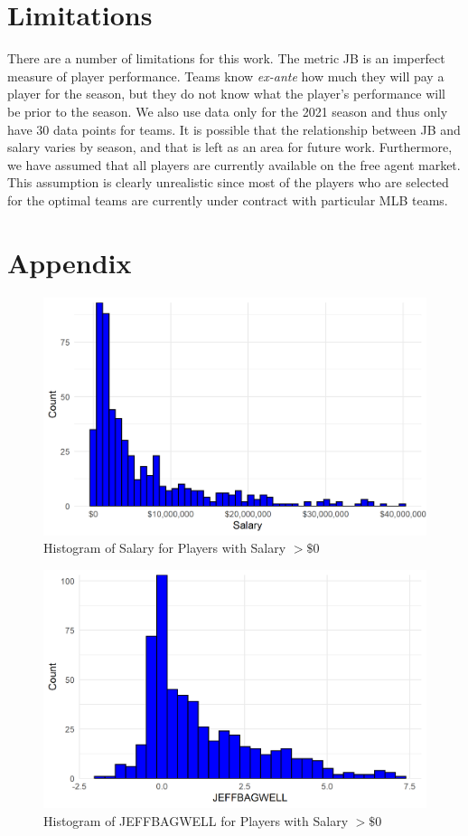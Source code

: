 \documentclass{article}
\begin{document}
\section{Limitations}

There are a number of limitations for this work. The metric JB is an imperfect measure of player performance. Teams know \emph{ex-ante} how much they will pay a player for the season, but they do not know what the player's performance will be prior to the season. We also use data only for the 2021 season and thus only have 30 data points for teams. It is possible that the relationship between JB and salary varies by season, and that is left as an area for future work. Furthermore, we have assumed that all players are currently available on the free agent market. This assumption is clearly unrealistic since most of the players who are selected for the optimal teams are currently under contract with particular MLB teams. 

\newpage




\newpage

\section{Appendix}

\begin{figure}[h]
\caption{Histogram of Salary for Players with Salary $> \$0$}
\label{fig:salary_hist}
\centering
\includegraphics[width=0.7\paperwidth, scale=1.25]{salary_hist.png}
\end{figure}

\newpage
\begin{figure}[h]
\caption{Histogram of JEFFBAGWELL for Players with Salary $> \$0$}
\label{fig:bwar_hist}
\centering
\includegraphics[width=0.7\paperwidth, scale=1.25]{war_hist.png}
\end{figure}
\end{document}
